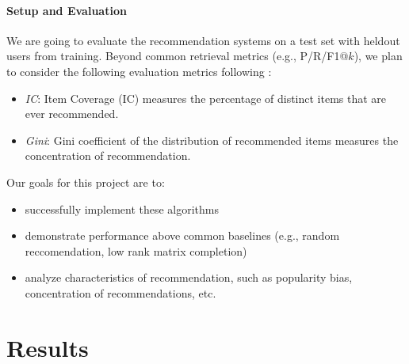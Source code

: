 \documentclass{article}
\begin{document}
\paragraph*{Setup and Evaluation}
We are going to evaluate the recommendation systems on a test set with heldout
 users from training.
Beyond common retrieval metrics (e.g., P/R/F1@$k$), we plan to consider the
 following evaluation metrics following
 \citet{anelliTopNRecommendationAlgorithms2022}:  \begin{itemize} \item {\em
             IC}: Item Coverage (IC) measures the percentage of distinct items that are ever
 recommended.
\item {\em Gini}: Gini coefficient of the distribution of recommended items
measures the concentration of recommendation.
\end{itemize}

Our goals for this project are to:
\begin{itemize}
  \item successfully implement these algorithms
  \item demonstrate performance above common baselines (e.g., random reccomendation,
  low rank matrix completion)  
  \item analyze characteristics of recommendation, such as popularity bias, 
concentration of recommendations, etc.  
\end{itemize} 

\section{Results}

\newpage


\end{document}
